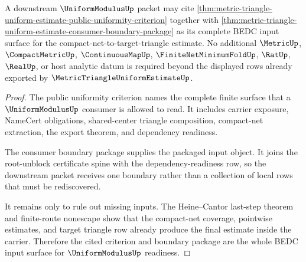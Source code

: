 \begin{theorem}
\label{thm:metric-triangle-uniform-estimate-uniformmodulus-readiness}
A downstream $\UniformModulusUp$ packet may cite \autoref{thm:metric-triangle-uniform-estimate-public-uniformity-criterion} together with \autoref{thm:metric-triangle-uniform-estimate-consumer-boundary-package} as its complete BEDC input surface for the compact-net-to-target-triangle estimate. No additional $\MetricUp$, $\CompactMetricUp$, $\ContinuousMapUp$, $\FiniteNetMinimumFoldUp$, $\RatUp$, $\RealUp$, or host analytic datum is required beyond the displayed rows already exported by $\MetricTriangleUniformEstimateUp$.
\end{theorem}
\begin{proof}
The public uniformity criterion names the complete finite surface that a $\UniformModulusUp$ consumer is allowed to read. It includes carrier exposure, NameCert obligations, shared-center triangle composition, compact-net extraction, the export theorem, and dependency readiness.

The consumer boundary package supplies the packaged input object. It joins the root-unblock certificate spine with the dependency-readiness row, so the downstream packet receives one boundary rather than a collection of local rows that must be rediscovered.

It remains only to rule out missing inputs. The Heine--Cantor last-step theorem and finite-route nonescape show that the compact-net coverage, pointwise estimates, and target triangle row already produce the final estimate inside the carrier. Therefore the cited criterion and boundary package are the whole BEDC input surface for $\UniformModulusUp$ readiness.
\end{proof}

